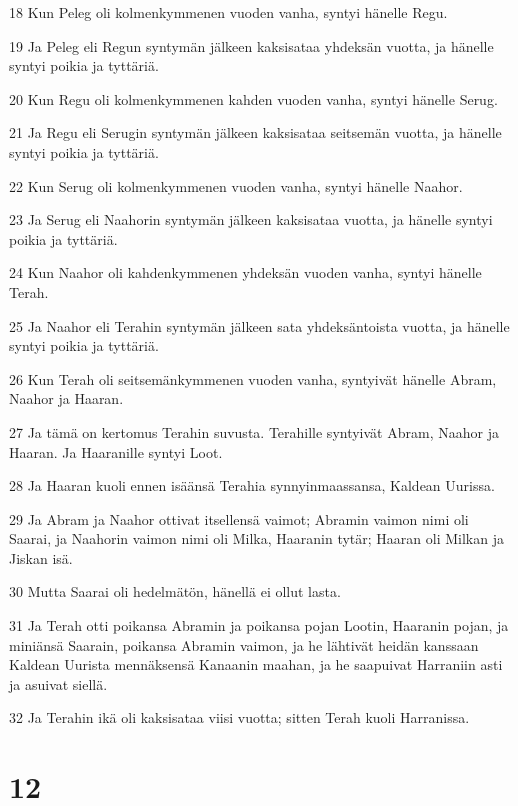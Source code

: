 \par 18 Kun Peleg oli kolmenkymmenen vuoden vanha, syntyi hänelle Regu.
\par 19 Ja Peleg eli Regun syntymän jälkeen kaksisataa yhdeksän vuotta, ja hänelle syntyi poikia ja tyttäriä.
\par 20 Kun Regu oli kolmenkymmenen kahden vuoden vanha, syntyi hänelle Serug.
\par 21 Ja Regu eli Serugin syntymän jälkeen kaksisataa seitsemän vuotta, ja hänelle syntyi poikia ja tyttäriä.
\par 22 Kun Serug oli kolmenkymmenen vuoden vanha, syntyi hänelle Naahor.
\par 23 Ja Serug eli Naahorin syntymän jälkeen kaksisataa vuotta, ja hänelle syntyi poikia ja tyttäriä.
\par 24 Kun Naahor oli kahdenkymmenen yhdeksän vuoden vanha, syntyi hänelle Terah.
\par 25 Ja Naahor eli Terahin syntymän jälkeen sata yhdeksäntoista vuotta, ja hänelle syntyi poikia ja tyttäriä.
\par 26 Kun Terah oli seitsemänkymmenen vuoden vanha, syntyivät hänelle Abram, Naahor ja Haaran.
\par 27 Ja tämä on kertomus Terahin suvusta. Terahille syntyivät Abram, Naahor ja Haaran. Ja Haaranille syntyi Loot.
\par 28 Ja Haaran kuoli ennen isäänsä Terahia synnyinmaassansa, Kaldean Uurissa.
\par 29 Ja Abram ja Naahor ottivat itsellensä vaimot; Abramin vaimon nimi oli Saarai, ja Naahorin vaimon nimi oli Milka, Haaranin tytär; Haaran oli Milkan ja Jiskan isä.
\par 30 Mutta Saarai oli hedelmätön, hänellä ei ollut lasta.
\par 31 Ja Terah otti poikansa Abramin ja poikansa pojan Lootin, Haaranin pojan, ja miniänsä Saarain, poikansa Abramin vaimon, ja he lähtivät heidän kanssaan Kaldean Uurista mennäksensä Kanaanin maahan, ja he saapuivat Harraniin asti ja asuivat siellä.
\par 32 Ja Terahin ikä oli kaksisataa viisi vuotta; sitten Terah kuoli Harranissa.

\chapter{12}


